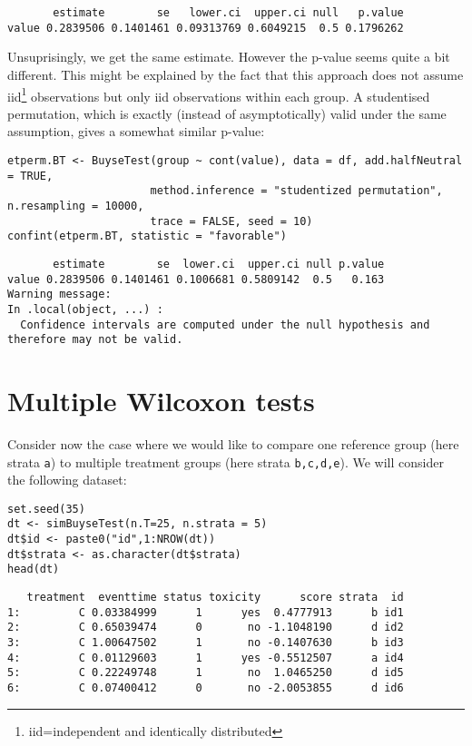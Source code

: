 \documentclass[12pt]{article}
\begin{document}
\begin{verbatim}
       estimate        se   lower.ci  upper.ci null   p.value
value 0.2839506 0.1401461 0.09313769 0.6049215  0.5 0.1796262
\end{verbatim}


Unsuprisingly, we get the same estimate. However the p-value seems
quite a bit different. This might be explained by the fact that this
approach does not assume iid\footnote{iid=independent and identically
distributed} observations but only iid observations within each
group. A studentised permutation, which is exactly (instead of
asymptotically) valid under the same assumption, gives a somewhat
similar p-value:
\lstset{language=r,label= ,caption= ,captionpos=b,numbers=none}
\begin{lstlisting}
etperm.BT <- BuyseTest(group ~ cont(value), data = df, add.halfNeutral = TRUE,
                      method.inference = "studentized permutation", n.resampling = 10000,
                      trace = FALSE, seed = 10)
confint(etperm.BT, statistic = "favorable")
\end{lstlisting}

\begin{verbatim}
       estimate        se  lower.ci  upper.ci null p.value
value 0.2839506 0.1401461 0.1006681 0.5809142  0.5   0.163
Warning message:
In .local(object, ...) :
  Confidence intervals are computed under the null hypothesis and therefore may not be valid.
\end{verbatim}

\section{Multiple Wilcoxon tests}
\label{sec:org3d82d86}

Consider now the case where we would like to compare one reference
group (here strata \texttt{a}) to multiple treatment groups (here strata
\texttt{b,c,d,e}). We will consider the following dataset:
\lstset{language=r,label= ,caption= ,captionpos=b,numbers=none}
\begin{lstlisting}
set.seed(35)
dt <- simBuyseTest(n.T=25, n.strata = 5)
dt$id <- paste0("id",1:NROW(dt))
dt$strata <- as.character(dt$strata) 
head(dt)
\end{lstlisting}

\begin{verbatim}
   treatment  eventtime status toxicity      score strata  id
1:         C 0.03384999      1      yes  0.4777913      b id1
2:         C 0.65039474      0       no -1.1048190      d id2
3:         C 1.00647502      1       no -0.1407630      b id3
4:         C 0.01129603      1      yes -0.5512507      a id4
5:         C 0.22249748      1       no  1.0465250      d id5
6:         C 0.07400412      0       no -2.0053855      d id6
\end{verbatim}
\end{document}
